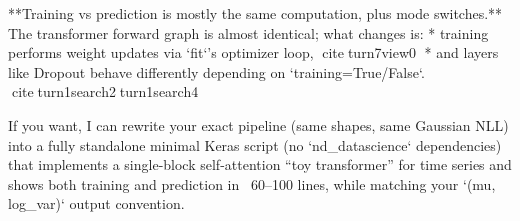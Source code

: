 \documentclass[a4paper]{article}
\begin{document}
    **Training vs prediction is mostly the same computation, plus mode switches.** The transformer forward graph is almost identical; what changes is:
    * training performs weight updates via `fit`’s optimizer loop, citeturn7view0
    * and layers like Dropout behave differently depending on `training=True/False`. citeturn1search2turn1search4
    
    If you want, I can rewrite your exact pipeline (same shapes, same Gaussian NLL) into a fully standalone minimal Keras script (no `nd_datascience` dependencies) that implements a single-block self-attention “toy transformer” for time series and shows both training and prediction in ~60–100 lines, while matching your `(mu, log_var)` output convention.
\end{document}
